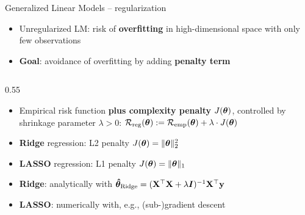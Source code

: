 \begin{frame}{Generalized Linear Models -- regularization}


\begin{itemize}
  \item Unregularized LM: risk of \textbf{overfitting} in high-dimensional 
  space with only few observations
  \item \textbf{Goal}: avoidance of overfitting by adding \textbf{penalty term}
\end{itemize}





\medskip
\begin{columns}[T, totalwidth=\textwidth]
    \begin{column}{0.55\textwidth}
        

\begin{itemize}
  \item Empirical risk function \textbf{plus complexity penalty} 
  $J(\bm{\theta})$, controlled by shrinkage parameter $\lambda > 0$:
  $\mathcal{R}_{\text{reg}}(\bm{\theta}) := \mathcal{R}_{\text{emp}}(\bm{\theta}) + \lambda \cdot J(\bm{\theta})$
    \item \textbf{Ridge} regression: L2 penalty $J(\bm{\theta}) = \|\bm{\theta}\|_2^2 $
    \item \textbf{LASSO} regression: L1 penalty $J(\bm{\theta}) = \|\bm{\theta}\|_1 $
\end{itemize}

\medskip

\begin{itemize}
  \item \textbf{Ridge}: analytically with 
  $\bm{\hat\theta}_{\text{Ridge}} = (\mathbf{X}^\top \mathbf{X}  + \lambda \bm{I})^{-1} \mathbf{X}^\top 
  \mathbf{y}$
  \item \textbf{LASSO}: numerically with, e.g., (sub-)gradient descent
\end{itemize}




\end{column}
\end{columns}
\end{frame}

